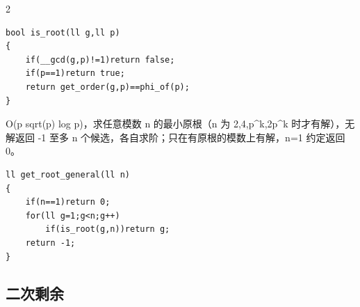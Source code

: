 \documentclass[UTF8,fontset=fandol,a4paper,twoside]{ctexart}
\newcommand{\note}[1]{{\fontsize{10}{12}\selectfont #1\par}}
\begin{document}
\begin{multicols}{2}
\begin{lstlisting}
bool is_root(ll g,ll p)
{
    if(__gcd(g,p)!=1)return false;
    if(p==1)return true;
    return get_order(g,p)==phi_of(p);
}
\end{lstlisting}
\note{O(\allowbreak{}p sqrt(\allowbreak{}p)\allowbreak{} log p)\allowbreak{}，求任意模数 n 的最小原根（n 为 2,\allowbreak{}4,\allowbreak{}p\textasciicircum{}k,\allowbreak{}2p\textasciicircum{}k 时才有解），无解返回 -\allowbreak{}1 至多 n 个候选，各自求阶；只在有原根的模数上有解，n=\allowbreak{}1 约定返回 0。}
\begin{lstlisting}
ll get_root_general(ll n)
{
    if(n==1)return 0;
    for(ll g=1;g<n;g++)
        if(is_root(g,n))return g;
    return -1;
}
\end{lstlisting}
\subsection{二次剩余}


\end{multicols}
\end{document}
